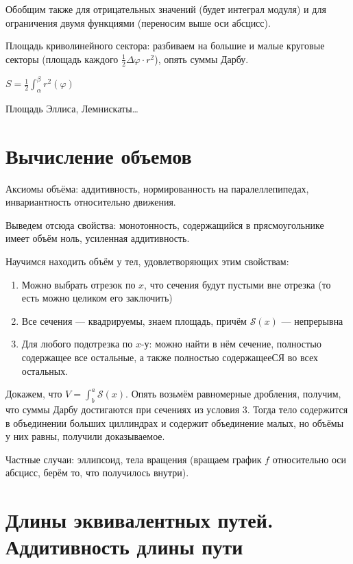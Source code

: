 \documentclass[12pt, a4paper]{article}
\begin{document}
    Обобщим также для отрицательных значений (будет интеграл модуля) и для ограничения двумя функциями (переносим выше оси абсцисс).

    \splitdoc

    Площадь криволинейного сектора: разбиваем на большие и малые круговые секторы (площадь каждого $\frac{1}{2}\Delta \varphi \cdot r^2$), 
    опять суммы Дарбу.

    $S = \frac{1}{2}\int^\beta_\alpha r^2(\varphi)$
    
    Площадь Эллиса, Лемнискаты…

\section{Вычисление объемов}

    Аксиомы объёма: аддитивность, нормированность на паралеллепипедах, инвариантность относительно движения.

    Выведем отсюда свойства: монотонность, содержащийся в прясмоугольнике имеет объём ноль, усиленная аддитивность.

    Научимся находить объём у тел, удовлетворяющих этим свойствам:

    \begin{enumerate}
        \item Можно выбрать отрезок по $x$, что сечения будут пустыми вне отрезка (то есть можно целиком его заключить)
        \item Все сечения — квадрируемы, знаем площадь, причём $\mathcal{S}(x)$ — непрерывна
        \item Для любого подотрезка по $x$-у: можно найти в нём сечение, полностью содержащее все остальные, а также полностью содержащееСЯ во всех остальных.
    \end{enumerate}

    Докажем, что $V = \int^a_b \mathcal{S}(x)$. Опять возьмём равномерные дробления, получим, 
    что суммы Дарбу достигаются при сечениях из условия 3. 
    Тогда тело содержится в объединении больших циллиндрах и содержит объединение малых, 
    но объёмы у них равны, получили доказываемое.

    Частные случаи: эллипсоид, тела вращения (вращаем график $f$ относительно оси абсцисс, берём то, что получилось внутри).


\section{Длины эквивалентных путей. Аддитивность длины пути}
\end{document}
